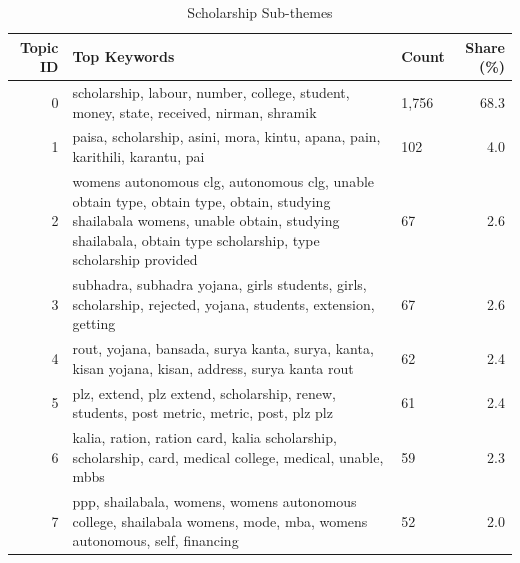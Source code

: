 \begin{table}[htbp]
\centering
\caption{Scholarship Sub-themes}
\label{tab:topics_Scholarship}
\begin{tabular}{rlp{7cm}r}
\toprule
Topic ID & Top Keywords & Count & Share (\%) \\
\midrule
0 & scholarship, labour, number, college, student, money, state, received, nirman, shramik & 1,756 & 68.3 \\
1 & paisa, scholarship, asini, mora, kintu, apana, pain, karithili, karantu, pai & 102 & 4.0 \\
2 & womens autonomous clg, autonomous clg, unable obtain type, obtain type, obtain, studying shailabala womens, unable obtain, studying shailabala, obtain type scholarship, type scholarship provided & 67 & 2.6 \\
3 & subhadra, subhadra yojana, girls students, girls, scholarship, rejected, yojana, students, extension, getting & 67 & 2.6 \\
4 & rout, yojana, bansada, surya kanta, surya, kanta, kisan yojana, kisan, address, surya kanta rout & 62 & 2.4 \\
5 & plz, extend, plz extend, scholarship, renew, students, post metric, metric, post, plz plz & 61 & 2.4 \\
6 & kalia, ration, ration card, kalia scholarship, scholarship, card, medical college, medical, unable, mbbs & 59 & 2.3 \\
7 & ppp, shailabala, womens, womens autonomous college, shailabala womens, mode, mba, womens autonomous, self, financing & 52 & 2.0 \\
\bottomrule
\end{tabular}
\end{table}